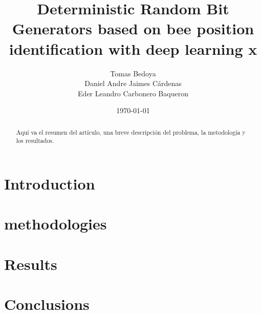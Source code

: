 \documentclass[conference]{IEEEtran}
\title{Deterministic Random Bit Generators based on bee position identification with deep learning x}
\author{Tomas Bedoya \\
Daniel Andre Jaimes Cárdenas  \\
Eder Leandro Carbonero Baqueron \\}
\date{\today}
\begin{document}
\maketitle
\begin{abstract}
Aquí va el resumen del artículo, una breve descripción del problema, la metodología y los resultados.
\end{abstract}

\section{Introduction}


\section{methodologies}


\section{Results}


\section{Conclusions}




\end{document}
